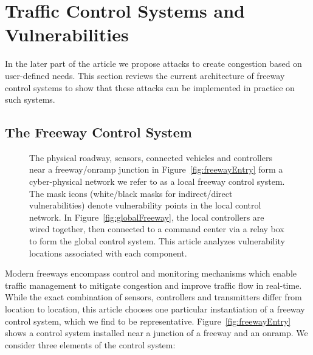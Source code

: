 \section{Traffic Control Systems and Vulnerabilities}

In the later part of the article we propose attacks to create congestion based on user-defined needs. This section reviews the current architecture of freeway control systems to show that these attacks can be implemented in practice on such systems.

	\subsection{The Freeway Control System}
	\label{sub:freeway-control-system}

	\begin{figure}

	\hfill
	\caption{The physical roadway, sensors, connected vehicles and controllers near a freeway/onramp junction in Figure~\ref{fig:freewayEntry} form a cyber-physical network we refer to as a local freeway control system. The mask icons (white/black masks for indirect/direct vulnerabilities) denote vulnerability points in the local control network.  In Figure~\ref{fig:globalFreeway}, the local controllers are wired together, then connected to a command center via a relay box to form the global control system. This article analyzes vulnerability locations associated with each component.}
	\end{figure}
    		Modern freeways encompass control and monitoring mechanisms which enable traffic management to mitigate congestion and improve traffic flow in real-time. While the exact combination of sensors, controllers and transmitters differ from location to location, this article chooses one particular instantiation of a freeway control system, which we find to be representative. Figure~\ref{fig:freewayEntry} shows a control system installed near a junction of a freeway and an onramp. We consider three elements of the control system:
